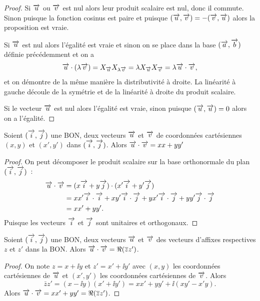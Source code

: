 \begin{proof}
  Si \(\overrightarrow{u}\) ou \(\overrightarrow{v}\) est nul alors leur produit scalaire est nul, donc il 
  commute. Sinon puisque la fonction cosinus est paire et puisque \((\overrightarrow{u} , \overrightarrow{v}) 
  = -(\overrightarrow{v} , \overrightarrow{u})\) alors la proposition est vraie.

  Si \(\overrightarrow{u}\) est nul alors l'égalité est vraie et sinon on se place dans la base 
  \((\overrightarrow{a},\overrightarrow{b})\) définie précédemment et on a \begin{equation}
    \overrightarrow{u} \cdot (\lambda \overrightarrow{v}) = X_{\overrightarrow{u}} X_{\lambda \overrightarrow{v}} = \lambda X_{\overrightarrow{u}} X_{\overrightarrow{v}} 
    = \lambda \overrightarrow{u} \cdot \overrightarrow{v},
  \end{equation}
  et on démontre de la même manière la distributivité à droite. La linéarité à 
  gauche découle de la symétrie et de la linéarité à droite du produit scalaire.

  Si le vecteur \(\overrightarrow{u}\) est nul alors l'égalité est vraie, sinon puisque \((\overrightarrow{u} 
  , \overrightarrow{u}) = 0\) alors on a l'égalité.
\end{proof}

\begin{prop}
  Soient \((\overrightarrow{i} , \overrightarrow{j})\) une BON, deux vecteurs \(\overrightarrow{u}\) et \(\overrightarrow{v}\) de 
  coordonnées cartésiennes \((x , y)\) et \((x',y')\) dans \((\overrightarrow{i} , \overrightarrow{j})\). 
  Alors \(\overrightarrow{u} \cdot \overrightarrow{v} = xx + yy'\)
\end{prop}

\begin{proof}
  On peut décomposer le produit scalaire sur la base orthonormale du plan \((\overrightarrow{i} 
  , \overrightarrow{j})\)~:
  \begin{align}
    \overrightarrow{u} \cdot \overrightarrow{v} &= (x \overrightarrow{i} + y \overrightarrow{j}) \cdot (x' \overrightarrow{i} + y' \overrightarrow{j}) \\
                  &= x x' \overrightarrow{i} \cdot \overrightarrow{i} + xy' \overrightarrow{i} \cdot \overrightarrow{j} + yx' \overrightarrow{i} \cdot \overrightarrow{j} 
                  + yy' \overrightarrow{j} \cdot \overrightarrow{j}\\
                  & = xx' +yy'.
  \end{align}
  Puisque les vecteurs \(\overrightarrow{i}\) et \(\overrightarrow{j}\) sont unitaires et orthogonaux.
\end{proof}

\begin{prop}
  Soient \((\overrightarrow{i} , \overrightarrow{j})\) une BON, deux vecteurs \(\overrightarrow{u}\) et \(\overrightarrow{v}\) des vecteurs 
  d'affixes respectives \(z\) et \(z'\) dans la BON\@. Alors \(\overrightarrow{u} \cdot \overrightarrow{v} = 
  \Re(\overline{z} z')\).
\end{prop}

\begin{proof}
  On note \(z = x + \ii y\) et \(z' = x' + \ii y'\) avec \((x , y)\) les 
  coordonnées cartésiennes de \(\overrightarrow{u}\) et \((x',y')\) les coordonnées 
  cartésiennes de \(\overrightarrow{v}\). Alors
  \begin{equation}
    \bar{z} z' = (x - \ii y)(x' + \ii y') = xx' + yy' + \ii(xy'-x'y).
  \end{equation}
  Alors \(\overrightarrow{u} \cdot \overrightarrow{v} = xx' + yy' = \Re(\overline{z} z')\).
\end{proof}

